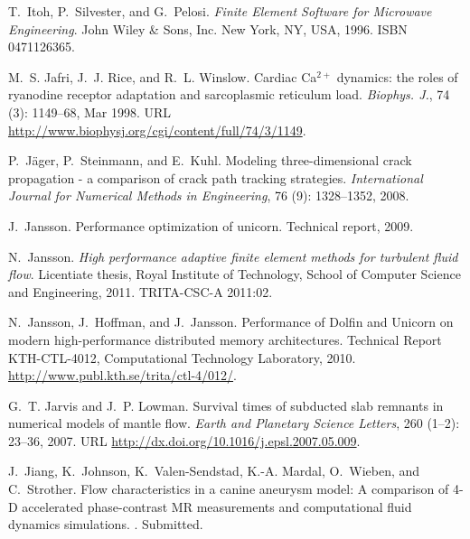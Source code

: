 \begin{thebibliography}{467}
T.~Itoh, P.~Silvester, and G.~Pelosi.
\newblock \emph{Finite Element Software for Microwave Engineering}.
\newblock John Wiley \& Sons, Inc. New York, NY, USA, 1996.
\newblock ISBN 0471126365.

M.~S. Jafri, J.~J. Rice, and R.~L. Winslow.
\newblock Cardiac {C}a$^{2+}$ dynamics: the roles of ryanodine receptor
  adaptation and sarcoplasmic reticulum load.
\newblock \emph{Biophys. J.}, 74 (3): 1149--68, Mar 1998.
\newblock URL \url{http://www.biophysj.org/cgi/content/full/74/3/1149}.

P.~J\"ager, P.~Steinmann, and E.~Kuhl.
\newblock Modeling three-dimensional crack propagation - a comparison of crack
  path tracking strategies.
\newblock \emph{International Journal for Numerical Methods in Engineering},
  76 (9): 1328--1352, 2008.

J.~Jansson.
\newblock Performance optimization of unicorn.
\newblock Technical report, 2009.

N.~Jansson.
\newblock \emph{High performance adaptive finite element methods for turbulent
  fluid flow}.
\newblock Licentiate thesis, Royal Institute of Technology, School of Computer
  Science and Engineering, 2011.
\newblock TRITA-CSC-A 2011:02.

N.~Jansson, J.~Hoffman, and J.~Jansson.
\newblock Performance of {D}olfin and {U}nicorn on modern high-performance
  distributed memory architectures.
\newblock Technical Report KTH-CTL-4012, Computational Technology Laboratory,
  2010.
\newblock \url{http://www.publ.kth.se/trita/ctl-4/012/}.

G.~T. Jarvis and J.~P. Lowman.
\newblock Survival times of subducted slab remnants in numerical models of
  mantle flow.
\newblock \emph{Earth and Planetary Science Letters}, 260
  (1--2): 23--36, 2007.
\newblock URL \url{http://dx.doi.org/10.1016/j.epsl.2007.05.009}.

J.~Jiang, K.~Johnson, K.~Valen-Sendstad, K.-A. Mardal, O.~Wieben, and
  C.~Strother.
\newblock Flow characteristics in a canine aneurysm model: A comparison of
  {4-D} accelerated phase-contrast {MR} measurements and computational fluid
  dynamics simulations.
.
\newblock Submitted.


\end{thebibliography}
